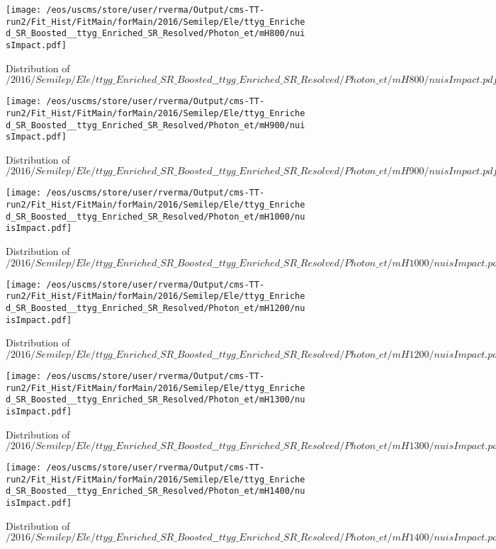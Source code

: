\begin{figure}
\centering
\texttt{[image: /eos/uscms/store/user/rverma/Output/cms-TT-run2/Fit\_Hist/FitMain/forMain/2016/Semilep/Ele/ttyg\_Enriched\_SR\_Boosted\_\_ttyg\_Enriched\_SR\_Resolved/Photon\_et/mH800/nuisImpact.pdf]}
\caption{Distribution of $/2016/Semilep/Ele/ttyg\_Enriched\_SR\_Boosted\_\_ttyg\_Enriched\_SR\_Resolved/Photon\_et/mH800/nuisImpact.pdf$}
\end{figure}

\begin{figure}
\centering
\texttt{[image: /eos/uscms/store/user/rverma/Output/cms-TT-run2/Fit\_Hist/FitMain/forMain/2016/Semilep/Ele/ttyg\_Enriched\_SR\_Boosted\_\_ttyg\_Enriched\_SR\_Resolved/Photon\_et/mH900/nuisImpact.pdf]}
\caption{Distribution of $/2016/Semilep/Ele/ttyg\_Enriched\_SR\_Boosted\_\_ttyg\_Enriched\_SR\_Resolved/Photon\_et/mH900/nuisImpact.pdf$}
\end{figure}

\begin{figure}
\centering
\texttt{[image: /eos/uscms/store/user/rverma/Output/cms-TT-run2/Fit\_Hist/FitMain/forMain/2016/Semilep/Ele/ttyg\_Enriched\_SR\_Boosted\_\_ttyg\_Enriched\_SR\_Resolved/Photon\_et/mH1000/nuisImpact.pdf]}
\caption{Distribution of $/2016/Semilep/Ele/ttyg\_Enriched\_SR\_Boosted\_\_ttyg\_Enriched\_SR\_Resolved/Photon\_et/mH1000/nuisImpact.pdf$}
\end{figure}

\begin{figure}
\centering
\texttt{[image: /eos/uscms/store/user/rverma/Output/cms-TT-run2/Fit\_Hist/FitMain/forMain/2016/Semilep/Ele/ttyg\_Enriched\_SR\_Boosted\_\_ttyg\_Enriched\_SR\_Resolved/Photon\_et/mH1200/nuisImpact.pdf]}
\caption{Distribution of $/2016/Semilep/Ele/ttyg\_Enriched\_SR\_Boosted\_\_ttyg\_Enriched\_SR\_Resolved/Photon\_et/mH1200/nuisImpact.pdf$}
\end{figure}

\begin{figure}
\centering
\texttt{[image: /eos/uscms/store/user/rverma/Output/cms-TT-run2/Fit\_Hist/FitMain/forMain/2016/Semilep/Ele/ttyg\_Enriched\_SR\_Boosted\_\_ttyg\_Enriched\_SR\_Resolved/Photon\_et/mH1300/nuisImpact.pdf]}
\caption{Distribution of $/2016/Semilep/Ele/ttyg\_Enriched\_SR\_Boosted\_\_ttyg\_Enriched\_SR\_Resolved/Photon\_et/mH1300/nuisImpact.pdf$}
\end{figure}

\begin{figure}
\centering
\texttt{[image: /eos/uscms/store/user/rverma/Output/cms-TT-run2/Fit\_Hist/FitMain/forMain/2016/Semilep/Ele/ttyg\_Enriched\_SR\_Boosted\_\_ttyg\_Enriched\_SR\_Resolved/Photon\_et/mH1400/nuisImpact.pdf]}
\caption{Distribution of $/2016/Semilep/Ele/ttyg\_Enriched\_SR\_Boosted\_\_ttyg\_Enriched\_SR\_Resolved/Photon\_et/mH1400/nuisImpact.pdf$}
\end{figure}

